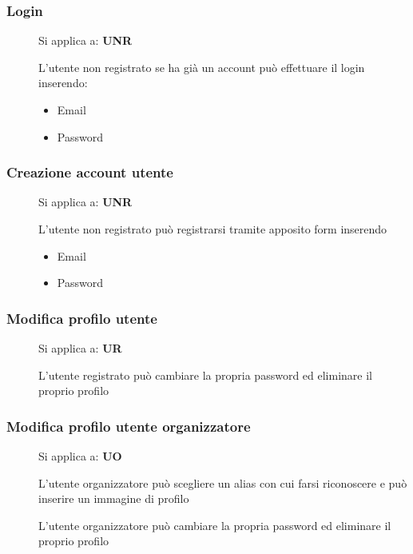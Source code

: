 \documentclass{article}
\begin{document}
\subsubsection{Login} \label{rf_8}
\begin{description}
    \item[] Si applica a: \textbf{UNR}
    \item[] L'utente non registrato se ha già un account può effettuare il login inserendo:
        \begin{itemize}
            \item Email
            \item Password
        \end{itemize}
\end{description}
\subsubsection{Creazione account utente} \label{rf_9}
\begin{description}
    \item[] Si applica a: \textbf{UNR}
    \item[] L'utente non registrato può registrarsi tramite apposito form inserendo
        \begin{itemize}
            \item Email
            \item Password
        \end{itemize}
\end{description}
\subsubsection{Modifica profilo utente} \label{rf_10}
\begin{description}
    \item[] Si applica a: \textbf{UR}
    \item[] L'utente registrato può cambiare la propria password ed eliminare il proprio profilo
\end{description}
\subsubsection{Modifica profilo utente organizzatore} \label{rf_11}
\begin{description}
    \item[] Si applica a: \textbf{UO}
    \item[] L'utente organizzatore può scegliere un alias con cui farsi riconoscere e può inserire un immagine di profilo
    \item[] L'utente organizzatore può cambiare la propria password ed eliminare il proprio profilo
\end{description}
\end{document}
